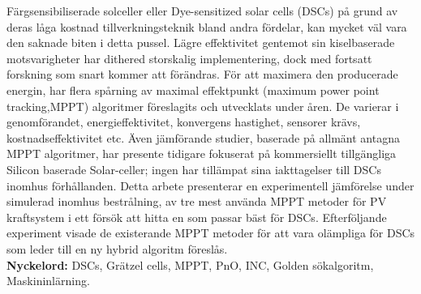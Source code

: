 Färgsensibiliserade solceller eller Dye-sensitized solar cells (DSCs) på grund av deras låga kostnad tillverkningsteknik bland andra fördelar, kan mycket väl vara den saknade biten i detta pussel. Lägre effektivitet gentemot sin kiselbaserade motsvarigheter har dithered storskalig implementering, dock med fortsatt forskning som snart kommer att förändras. För att maximera den producerade energin, har flera spårning av maximal effektpunkt (maximum power point tracking,MPPT) algoritmer föreslagits och utvecklats under åren. De varierar i genomförandet, energieffektivitet, konvergens hastighet, sensorer krävs, kostnadseffektivitet etc. Även jämförande studier, baserade på allmänt antagna MPPT algoritmer, har presente tidigare fokuserat på kommersiellt tillgängliga Silicon baserade Solar-celler; ingen har tillämpat sina iakttagelser till DSCs inomhus förhållanden. Detta arbete presenterar en experimentell jämförelse under simulerad inomhus bestrålning, av tre mest använda MPPT metoder för PV kraftsystem i ett försök att hitta en som passar bäst för DSCs. Efterföljande experiment visade de existerande MPPT metoder för att vara olämpliga för DSCs som leder till en ny hybrid algoritm föreslås.\\

{\bf Nyckelord:} DSCs, Grätzel cells, MPPT, PnO, INC, Golden sökalgoritm, Maskininlärning. 
\acresetall
